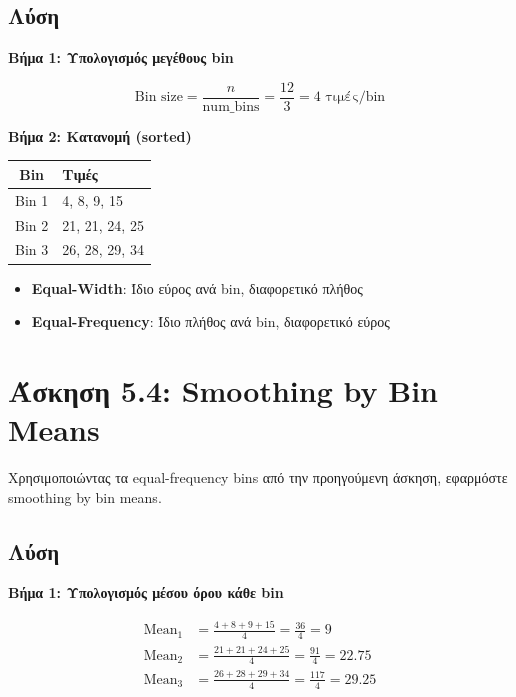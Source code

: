\subsection*{Λύση}

\textbf{Βήμα 1: Υπολογισμός μεγέθους bin}

$$\text{Bin size} = \frac{n}{\text{num\_bins}} = \frac{12}{3} = 4 \text{ τιμές/bin}$$

\textbf{Βήμα 2: Κατανομή (sorted)}

\begin{center}
\begin{tabular}{cl}
\toprule
\textbf{Bin} & \textbf{Τιμές} \\
\midrule
Bin 1 & 4, 8, 9, 15 \\
Bin 2 & 21, 21, 24, 25 \\
Bin 3 & 26, 28, 29, 34 \\
\bottomrule
\end{tabular}
\end{center}

\begin{infobox}
\begin{itemize}
    \item \textbf{Equal-Width}: Ίδιο εύρος ανά bin, διαφορετικό πλήθος
    \item \textbf{Equal-Frequency}: Ίδιο πλήθος ανά bin, διαφορετικό εύρος
\end{itemize}
\end{infobox}

\section{Άσκηση 5.4: Smoothing by Bin Means}

\begin{formulabox}[Εκφώνηση]
Χρησιμοποιώντας τα equal-frequency bins από την προηγούμενη άσκηση, εφαρμόστε
smoothing by bin means.
\end{formulabox}

\subsection*{Λύση}

\textbf{Βήμα 1: Υπολογισμός μέσου όρου κάθε bin}

\begin{align*}
\text{Mean}_1 &= \frac{4 + 8 + 9 + 15}{4} = \frac{36}{4} = 9 \\
\text{Mean}_2 &= \frac{21 + 21 + 24 + 25}{4} = \frac{91}{4} = 22.75 \\
\text{Mean}_3 &= \frac{26 + 28 + 29 + 34}{4} = \frac{117}{4} = 29.25
\end{align*}

